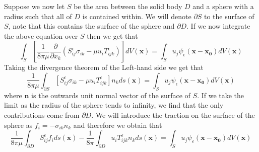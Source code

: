 Suppose we now let $S$ be the area between the solid body $D$ and a sphere with a radius such that all of $D$ is contained within. We will denote $\partial S$ to the surface of $S$, note that this contains the surface of the sphere and $\partial D$. If we now integrate the above equation over $S$ then we get that
\begin{equation*}
  \int_{S} \left[\frac{1}{8\pi\mu}\frac{\partial}{\partial x_k}(S^\epsilon_{ij}\sigma_{ik} - \mu u_i T^\epsilon_{ijk})\right] dV(\mathbf{x}) = \int_{S} u_j\psi_\epsilon(\mathbf{x}-\mathbf{x_0}) dV(\mathbf{x})
\end{equation*}
Taking the divergence theorem of the Left-hand side we get that
\begin{equation*}
  \frac{1}{8\pi\mu}\int_{\partial S} \left[S^\epsilon_{ij}\sigma_{ik} - \mu u_i T^\epsilon_{ijk}\right]n_k ds(\mathbf{x}) = \int_{S} u_j\psi_\epsilon(\mathbf{x}-\mathbf{x_0}) dV(\mathbf{x})
\end{equation*}
where $\mathbf{n}$ is the outwards unit normal vector of the surface of $S$. If we take the limit as the radius of the sphere tends to infinity, we find that the only contributions come from $\partial D$. We will introduce the traction on the surface of the sphere as $f_i = -\sigma_{ik}n_k$ and therefore we obtain that
\begin{equation}
  \label{eq:BIE3}
    \frac{1}{8\pi\mu}\int_{\partial D} S^\epsilon_{ij}f_i ds(\mathbf{x}) - \frac{1}{8\pi}\int_{\partial D} u_i T^\epsilon_{ijk}n_k ds(\mathbf{x}) = \int_{S} u_j\psi_\epsilon(\mathbf{x}-\mathbf{x_0}) dV(\mathbf{x})
\end{equation}

